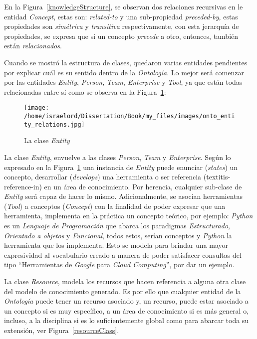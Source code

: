 En la Figura~\ref{knowledgeStructure}, se observan dos relaciones recursivas en le entidad \textit{Concept}, estas son: \textit{related-to} y una sub-propiedad \textit{preceded-by}, estas propiedades son \textit{simétrica} y \textit{transitiva} respectivamente, con esta jerarquía de propiedades, se expresa que si un concepto \textit{precede} a otro, entonces, también están \textit{relacionados}.

Cuando se mostró la estructura de clases, quedaron varias entidades pendientes por explicar cuál es su sentido dentro de la \textit{Ontología}. Lo mejor será comenzar por las entidades \textit{Entity}, \textit{Person}, \textit{Team}, \textit{Enterprise} y \textit{Tool}, ya que están todas relacionadas entre sí como se observa en la Figura~\ref{entityRelations}:

\begin{figure}[!h]
    \begin{center}
        \texttt{[image: /home/israelord/Dissertation/Book/my\_files/images/onto\_entity\_relations.jpg]}
        \caption{La clase \textit{Entity}}
        \label{entityRelations}
    \end{center}
\end{figure}

La clase \textit{Entity}, envuelve a las clases \textit{Person}, \textit{Team} y \textit{Enterprise}. Según lo expresado en la Figura~\ref{entityRelations} una instancia de \textit{Entity} puede enunciar (\textit{states}) un concepto, desarrollar (\textit{develops}) una herramienta o ser referencia (textit{is-reference-in}) en un área de conocimiento. Por herencia, cualquier sub-clase de \textit{Entity} será capaz de hacer lo mismo. Adicionalmente, se asocian herramientas (\textit{Tool}) a conceptos (\textit{Concept}) con la finalidad de poder expresar que una herramienta, implementa en la práctica un concepto teórico, por ejemplo: \textit{Python} es un \textit{Lenguaje de Programación} que abarca los paradigmas \textit{Estructurado}, \textit{Orientado a objetos} y \textit{Funcional}, todos estos, serían conceptos y \textit{Python} la herramienta que los implementa. Esto se modela para brindar una mayor expresividad al vocabulario creado a manera de poder satisfacer consultas del tipo ``Herramientas de \textit{Google} para \textit{Cloud Computing}'', por dar un ejemplo.

La clase \textit{Resource}, modela los recursos que hacen referencia a alguna otra clase del modelo de conocimiento generado. Es por ello que cualquier entidad de la \textit{Ontología} puede tener un recurso asociado y, un recurso, puede estar asociado a un concepto si es muy específico, a un área de conocimiento si es más general o, incluso, a la disciplina si es lo suficientemente global como para abarcar toda su extensión, ver Figura~\ref{resourceClass}.

